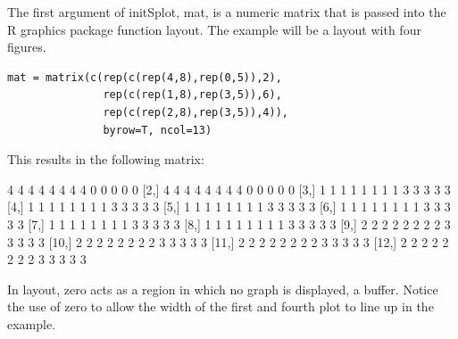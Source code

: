 \documentclass[]{article}
\begin{document}
\indent The first argument of initSplot, mat, is a numeric matrix that is passed into the R graphics package function layout. The example will be a layout with four figures. 

\begin{verbatim}
mat = matrix(c(rep(c(rep(4,8),rep(0,5)),2),
               rep(c(rep(1,8),rep(3,5)),6),
               rep(c(rep(2,8),rep(3,5)),4)),
               byrow=T, ncol=13)

\end{verbatim}

\indent This results in the following matrix:

\begin{Schunk}
\begin{Soutput}
      [,1] [,2] [,3] [,4] [,5] [,6] [,7] [,8] [,9] [,10] [,11] [,12] [,13]
 [1,]    4    4    4    4    4    4    4    4    0     0     0     0     0
 [2,]    4    4    4    4    4    4    4    4    0     0     0     0     0
 [3,]    1    1    1    1    1    1    1    1    3     3     3     3     3
 [4,]    1    1    1    1    1    1    1    1    3     3     3     3     3
 [5,]    1    1    1    1    1    1    1    1    3     3     3     3     3
 [6,]    1    1    1    1    1    1    1    1    3     3     3     3     3
 [7,]    1    1    1    1    1    1    1    1    3     3     3     3     3
 [8,]    1    1    1    1    1    1    1    1    3     3     3     3     3
 [9,]    2    2    2    2    2    2    2    2    3     3     3     3     3
[10,]    2    2    2    2    2    2    2    2    3     3     3     3     3
[11,]    2    2    2    2    2    2    2    2    3     3     3     3     3
[12,]    2    2    2    2    2    2    2    2    3     3     3     3     3
\end{Soutput}
\end{Schunk}

 In layout, zero acts as a region in which no graph is displayed, a buffer. Notice the use of zero to allow the width of the first and fourth plot to line up in the example.
\vskip 10mm
\end{document}

